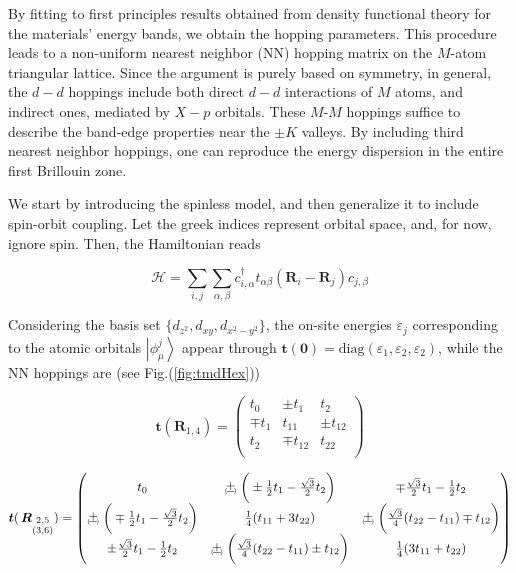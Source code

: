 By fitting to first principles results obtained from density functional theory for the materials' energy bands, we obtain the hopping parameters.
This procedure leads to a non-uniform nearest neighbor (NN) hopping matrix on the $M$-atom triangular lattice.
Since the argument is purely based on symmetry, in general, the $d-d$ hoppings include both direct $d-d$ interactions of $M$ atoms, and indirect ones, mediated by $X-p$ orbitals.
These $M$-$M$ hoppings suffice to describe the band-edge properties near the $\pm K$ valleys.
By including third nearest neighbor hoppings, one can reproduce the energy dispersion in  the entire first Brillouin zone.

We start by introducing the spinless model, and then generalize it to include spin-orbit coupling.
Let the greek indices represent orbital space, and, for now, ignore spin.
Then, the Hamiltonian reads

\begin{equation}
\mathcal{H} = \sum_{i, j} \sum_{\alpha, \beta} c_{i,\alpha}^\dagger t_{\alpha \beta} ( \bm R_i - \bm R_j ) c_{j, \beta}
\end{equation}

Considering the basis set $\{ d_{z^2} , d_{x y}, d_{ x^2 - y^2 } \} $, the on-site energies $\varepsilon_j$ corresponding to the atomic orbitals $\left| \phi_\mu^j \right\rangle$ appear through $\bm t ( \bm 0 ) = \text{diag} ( \varepsilon_1, \varepsilon_2, \varepsilon_2 )$, while the NN hoppings are (see Fig.(\ref{fig:tmdHex}))

\begin{equation}
\bm t ( \bm R_{1, 4} ) =
\begin{pmatrix}
t_0 & \pm t_1 & t_2 \\
\mp t_1 & t_{11} & \pm t_{12} \\
t_2 & \mp t_{12} & t_{22} \\
\end{pmatrix}
\end{equation}

\begin{equation}
\bm t (\, \bm R_{\substack{2, 5 \\ (3, 6)}} ) =
\begin{pmatrix}
t_0 & \Pm \bigg( \pm \frac{1}{2} t_1 - \frac{\sqrt{3}}{2} t_2 \bigg) & \mp \frac{\sqrt{3}}{2} t_1 - \frac{1}{2} t_2 \\
\Pm \bigg( \mp \frac{1}{2} t_1 - \frac{\sqrt{3}}{2} t_2 \bigg) & \frac{1}{4} ( t_{11} + 3 t_{22} ) & \Pm \bigg( \frac{\sqrt{3}}{4} ( t_{22} - t_{11} ) \mp t_{12} \bigg) \\
\pm \frac{\sqrt{3}}{2} t_1 - \frac{1}{2} t_2 & \Pm \bigg( \frac{\sqrt{3}}{4} ( t_{22} - t_{11} ) \pm t_{12} \bigg) & \frac{1}{4} ( 3 t_{11} + t_{22} )
\end{pmatrix}
\end{equation}